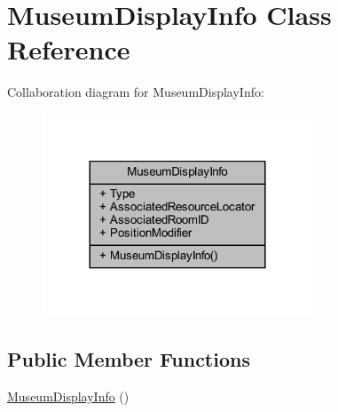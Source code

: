 \hypertarget{class_museum_display_info}{}\section{Museum\+Display\+Info Class Reference}
\label{class_museum_display_info}


Collaboration diagram for Museum\+Display\+Info\+:
\nopagebreak
\begin{figure}[H]
\begin{center}
\leavevmode
\includegraphics[width=228pt]{class_museum_display_info__coll__graph}
\end{center}
\end{figure}
\subsection*{Public Member Functions}
\begin{DoxyCompactItemize}
\item 
\mbox{\hyperlink{class_museum_display_info_a755099749d31cd5c6f06a2d0210832b9}{Museum\+Display\+Info}} ()
\end{DoxyCompactItemize}
